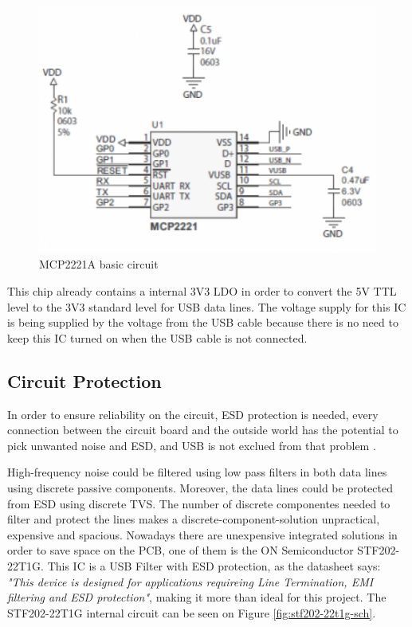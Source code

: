 		\begin{figure}[htbp]
			\centering
				\includegraphics[scale=1.2]{figuras/fig-mcp2221a-basic-circuit}
			\caption{MCP2221A basic circuit \cite{mcp2221a-basic-circuit}}
			\label{fig:mcp2221a-basic-circuit}
		\end{figure}

		This chip already contains a internal 3V3 LDO in order to convert the 5V TTL level to the 3V3 standard level for USB data lines. The voltage supply for this IC is being supplied by the voltage from the USB cable because there is no need to keep this IC turned on when the USB cable is not connected.


	\subsection{Circuit Protection}\label{ssec:usb-uart-circuit-protection}
		In order to ensure reliability on the circuit, ESD protection is needed, every connection between the circuit board and the outside world has the potential to pick unwanted noise and ESD, and USB is not exclued from that problem \cite{circuit-protection-usb}.

		High-frequency noise could be filtered using low pass filters in both data lines using discrete passive components. Moreover, the data lines could be protected from ESD using discrete TVS. The number of discrete componentes needed to filter and protect the lines makes a discrete-component-solution unpractical, expensive and spacious. Nowadays there are unexpensive integrated solutions in order to save space on the PCB, one of them is the ON Semiconductor STF202-22T1G. This IC is a USB Filter with ESD protection, as the datasheet \cite{stf202-22t1g-datasheet} says: \textit{"This device is designed for applications requireing Line Termination, EMI filtering and ESD protection"}, making it more than ideal for this project. The STF202-22T1G internal circuit can be seen on Figure \ref{fig:stf202-22t1g-sch}.

